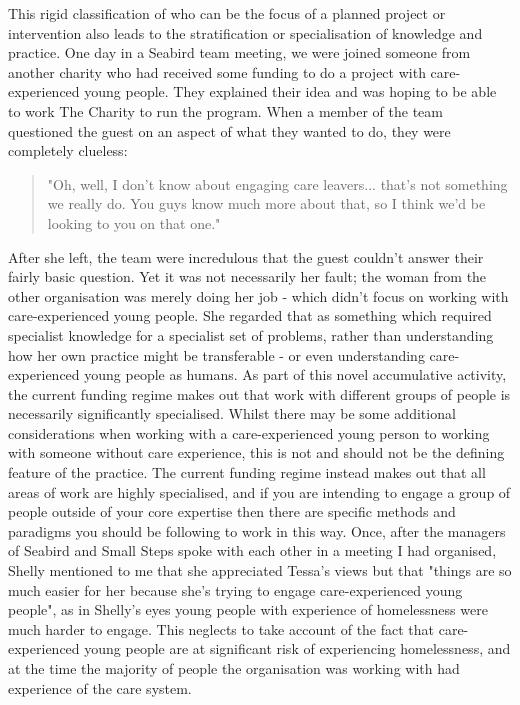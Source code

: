 This rigid classification of who can be the focus of a planned project or intervention also leads to the stratification or specialisation of knowledge and practice. One day in a Seabird team meeting, we were joined someone from another charity who had received some funding to do a project with care-experienced young people. They explained their idea and was hoping to be able to work The Charity to run the program. When a member of the team questioned the guest on an aspect of what they wanted to do, they were completely clueless:
\begin{quote}
"Oh, well, I don't know about engaging care leavers... that's not something we really do. You guys know much more about that, so I think we'd be looking to you on that one."
\end{quote}
After she left, the team were  incredulous that the guest couldn't answer their fairly basic question. Yet it was not necessarily her fault; the woman from the other organisation was merely doing her job - which didn't focus on working with care-experienced young people. She regarded that as something which required specialist knowledge for a specialist set of problems, rather than understanding how her own practice might be transferable - or even understanding care-experienced young people as humans. As part of this novel accumulative activity, the current funding regime makes out that work with different groups of people is necessarily significantly specialised. Whilst there may be some additional considerations when working with a care-experienced young person to working with someone without care experience, this is not and should not be the defining feature of the practice. The current funding regime instead makes out that all areas of work are highly specialised, and if you are intending to engage a group of people outside of your core expertise then there are specific methods and paradigms you should be following to work in this way. Once, after the managers of Seabird and Small Steps spoke with each other in a meeting I had organised, Shelly mentioned to me that she appreciated Tessa's views but that "things are so much easier for her because she's trying to engage care-experienced young people", as in Shelly's eyes young people with experience of homelessness were much harder to engage. This neglects to take account of the fact that care-experienced young people are at significant risk of experiencing homelessness, and at the time the majority of people the organisation was working with had experience of the care system.

